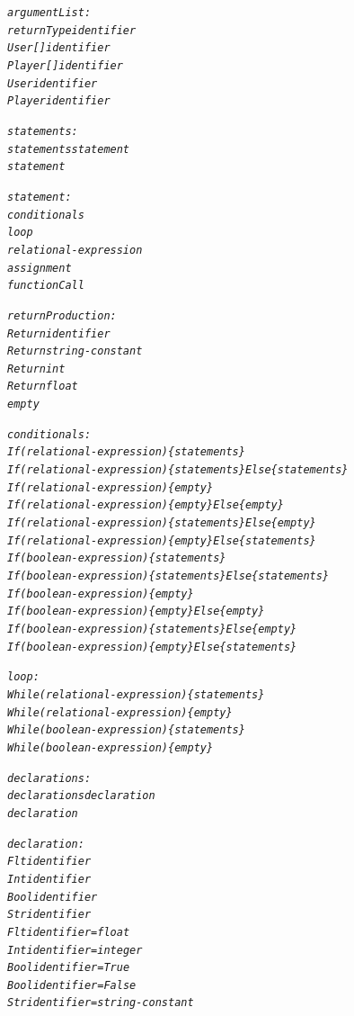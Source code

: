 \documentclass[12pt]{report}
\begin{document}
\begin{alltt}
     \textit{argumentList:}
          \textit{returnType identifier}
          \textit{User [ ] identifier}
          \textit{Player [ ] identifier}
          \textit{User identifier}
          \textit{Player identifier}

     \textit{statements:}
          \textit{statements statement}
          \textit{statement}

     \textit{statement:}
          \textit{conditionals}
          \textit{loop}
          \textit{relational-expression}
          \textit{assignment}
          \textit{functionCall}

     \textit{returnProduction:}
          \textit{Return identifier}
          \textit{Return string-constant}
          \textit{Return int}
          \textit{Return float}
          \textit{empty}

     \textit{conditionals:}
          \textit{If ( relational-expression ) \{ statements \}}
          \textit{If ( relational-expression ) \{ statements \} Else \{ statements \}}
          \textit{If ( relational-expression ) \{ empty \}}
          \textit{If ( relational-expression ) \{ empty \} Else \{ empty \}}
          \textit{If ( relational-expression ) \{ statements \} Else \{ empty \}}
          \textit{If ( relational-expression ) \{ empty \} Else \{ statements \}}
          \textit{If ( boolean-expression ) \{ statements \}}
          \textit{If ( boolean-expression ) \{ statements \} Else \{ statements \}}
          \textit{If ( boolean-expression ) \{ empty \}}
          \textit{If ( boolean-expression ) \{ empty \} Else \{ empty \}}
          \textit{If ( boolean-expression ) \{ statements \} Else \{ empty \}}
          \textit{If ( boolean-expression ) \{ empty \} Else \{ statements \}}

     \textit{loop:}
          \textit{While ( relational-expression ) \{ statements \}}
          \textit{While ( relational-expression ) \{ empty \}}
          \textit{While ( boolean-expression ) \{ statements \}}
          \textit{While ( boolean-expression ) \{ empty \}}

     \textit{declarations:}
          \textit{declarations declaration}
          \textit{declaration}

     \textit{declaration:}
          \textit{Flt identifier}
          \textit{Int identifier}
          \textit{Bool identifier}
          \textit{Str identifier}
          \textit{Flt identifier = float}
          \textit{Int identifier = integer}
          \textit{Bool identifier = True}
          \textit{Bool identifier = False}
          \textit{Str identifier = string-constant}


\end{alltt}
\end{document}
